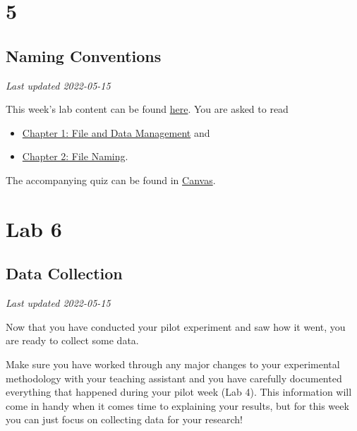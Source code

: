 \documentclass[
]{book}
\providecommand{\tightlist}{%
  \setlength{\itemsep}{0pt}\setlength{\parskip}{0pt}}
\begin{document}
\hypertarget{part-5}{%
\part*{5}\label{part-5}}

\hypertarget{naming-conventions}{%
\chapter*{Naming Conventions}\label{naming-conventions}}

\emph{Last updated 2022-05-15}

This week's lab content can be found \href{https://ubco-biology.github.io/Procedures-and-Guidelines/file-and-data-management.html}{here}. You are asked to read

\begin{itemize}
\tightlist
\item
  \href{https://ubco-biology.github.io/Procedures-and-Guidelines/file-and-data-management.html}{Chapter 1: File and Data Management} and
\item
  \href{https://ubco-biology.github.io/Procedures-and-Guidelines/file-naming.html}{Chapter 2: File Naming}.
\end{itemize}

The accompanying quiz can be found in \href{https://canvas.ubc.ca}{Canvas}.

\hypertarget{part-lab-6}{%
\part*{Lab 6}\label{part-lab-6}}

\hypertarget{data-collection}{%
\chapter*{Data Collection}\label{data-collection}}

\emph{Last updated 2022-05-15}

Now that you have conducted your pilot experiment and saw how it went, you are ready to collect some data.

Make sure you have worked through any major changes to your experimental methodology with your teaching assistant and you have carefully documented everything that happened during your pilot week (Lab 4). This information will come in handy when it comes time to explaining your results, but for this week you can just focus on collecting data for your research!
\end{document}
